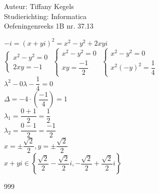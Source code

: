 \documentclass[a4paper]{article}
\begin{document}
  
\noindent \large Auteur: Tiffany Kegels \\
\noindent \large Studierichting: Informatica\\
\noindent \large Oefeningenreeks 1B nr. 37.13\\

\medskip

\normalsize

$-i = (x+yi)^2 = x^2 - y^2 + 2xyi$\\

$\left\{
	\begin{array}{l} 
		x^2 - y^2 = 0\\
		2xy = -1
	\end{array}
\right .$
$\left\{
	\begin{array}{l} 
		x^2 - y^2 = 0\\
		xy = \dfrac{-1}{2}
	\end{array}
\right .$
$\left\{
	\begin{array}{l} 
		x^2 - y^2 = 0\\
		x^2(-y)^2 = \dfrac{1}{4}
	\end{array}
\right .$\\

$\lambda^2 -0\lambda - \dfrac{1}{4} = 0$\\

$\Delta = -4\cdot \left(\dfrac{-1}{4} \right) = 1$\\

$\lambda_1 = \dfrac{0+1}{2} = \dfrac{1}{2}$\\

$\lambda_2 = \dfrac{0-1}{2} = \dfrac{-1}{2}$\\

$x = \pm\dfrac{\sqrt{2}}{2}, y = \pm \dfrac{\sqrt{2}}{2}$\\

$x+yi \in \left\{\dfrac{\sqrt{2}}{2} - \dfrac{\sqrt{2}}{2}i, -\dfrac{\sqrt{2}}{2} + \dfrac{\sqrt{2}}{2}i\right\}$\\

\begin{thebibliography}{999}

\end{thebibliography}
\end{document}
